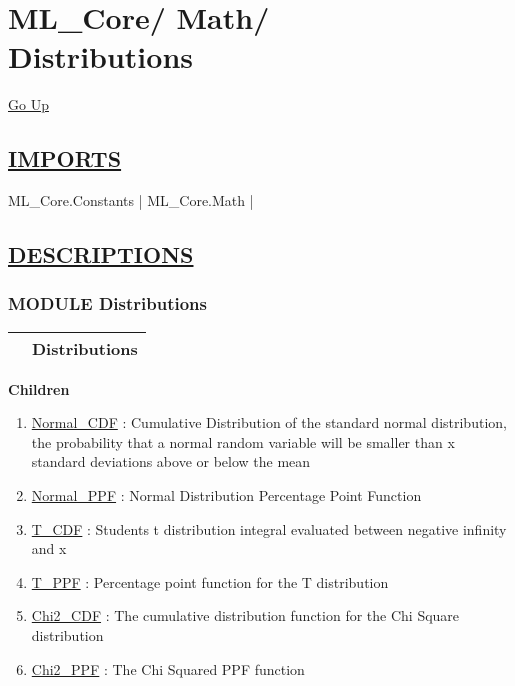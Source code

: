 \chapter*{\color{headfile}
{\large ML\_Core\slash\hspace{0pt}}
{\large Math\slash\hspace{0pt}}
 \\
Distributions
}
\hypertarget{ecldoc:toc:ML_Core.Math.Distributions}{}
\hyperlink{ecldoc:toc:root/ML_Core/Math}{Go Up}

\section*{\underline{\textsf{IMPORTS}}}
\begin{doublespace}
{\large
ML\_Core.Constants |
ML\_Core.Math |
}
\end{doublespace}

\section*{\underline{\textsf{DESCRIPTIONS}}}
\subsection*{\textsf{\colorbox{headtoc}{\color{white} MODULE}
Distributions}}

\hypertarget{ecldoc:ML_Core.Math.Distributions}{}

{\renewcommand{\arraystretch}{1.5}
\begin{tabularx}{\textwidth}{|>{\raggedright\arraybackslash}l|X|}
\hline
\hspace{0pt}\mytexttt{\color{red} } & \textbf{Distributions} \\
\hline
\end{tabularx}
}

\par


\textbf{Children}
\begin{enumerate}
\item \hyperlink{ecldoc:ml_core.math.distributions.normal_cdf}{Normal\_CDF}
: Cumulative Distribution of the standard normal distribution, the probability that a normal random variable will be smaller than x standard deviations above or below the mean
\item \hyperlink{ecldoc:ml_core.math.distributions.normal_ppf}{Normal\_PPF}
: Normal Distribution Percentage Point Function
\item \hyperlink{ecldoc:ml_core.math.distributions.t_cdf}{T\_CDF}
: Students t distribution integral evaluated between negative infinity and x
\item \hyperlink{ecldoc:ml_core.math.distributions.t_ppf}{T\_PPF}
: Percentage point function for the T distribution
\item \hyperlink{ecldoc:ml_core.math.distributions.chi2_cdf}{Chi2\_CDF}
: The cumulative distribution function for the Chi Square distribution
\item \hyperlink{ecldoc:ml_core.math.distributions.chi2_ppf}{Chi2\_PPF}
: The Chi Squared PPF function
\end{enumerate}

